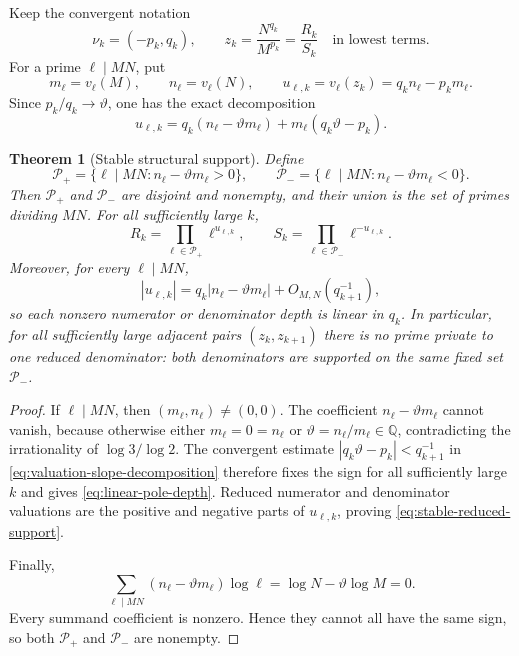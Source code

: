 \documentclass[11pt,oneside]{article}
\newtheorem{theorem}{Theorem}[section]
\theoremstyle{definition}
\theoremstyle{remark}
\newcommand{\Q}{\mathbb Q}
\newcommand{\thetaAE}{\vartheta}
\begin{document}
Keep the convergent notation
\[
 \nu_k=(-p_k,q_k),\qquad
 z_k=\frac{N^{q_k}}{M^{p_k}}=\frac{R_k}{S_k}
 \quad\text{in lowest terms}.
\]
For a prime $\ell\mid MN$, put
\begin{equation}
 m_\ell=v_\ell(M),\qquad n_\ell=v_\ell(N),\qquad
 u_{\ell,k}=v_\ell(z_k)=q_kn_\ell-p_km_\ell.
 \label{eq:structural-valuation}
\end{equation}
Since $p_k/q_k\to\thetaAE$, one has the exact decomposition
\begin{equation}
 u_{\ell,k}
 =q_k(n_\ell-\thetaAE m_\ell)
  +m_\ell(q_k\thetaAE-p_k).
 \label{eq:valuation-slope-decomposition}
\end{equation}

\begin{theorem}[Stable structural support]
\label{thm:support-stabilization}
Define
\begin{equation}
 \mathcal P_+=\{\ell\mid MN:n_\ell-\thetaAE m_\ell>0\},
 \qquad
 \mathcal P_-=\{\ell\mid MN:n_\ell-\thetaAE m_\ell<0\}.
 \label{eq:stable-support-sets}
\end{equation}
Then $\mathcal P_+$ and $\mathcal P_-$ are disjoint and nonempty, and their union is
the set of primes dividing $MN$.  For all sufficiently large $k$,
\begin{equation}
 R_k=\prod_{\ell\in\mathcal P_+}\ell^{u_{\ell,k}},
 \qquad
 S_k=\prod_{\ell\in\mathcal P_-}\ell^{-u_{\ell,k}}.
 \label{eq:stable-reduced-support}
\end{equation}
Moreover, for every $\ell\mid MN$,
\begin{equation}
 |u_{\ell,k}|
 =q_k|n_\ell-\thetaAE m_\ell|+O_{M,N}(q_{k+1}^{-1}),
 \label{eq:linear-pole-depth}
\end{equation}
so each nonzero numerator or denominator depth is linear in $q_k$.
In particular, for all sufficiently large adjacent pairs $(z_k,z_{k+1})$ there is no prime
private to one reduced denominator: both denominators are supported on the same fixed set
$\mathcal P_-$.
\end{theorem}

\begin{proof}
If $\ell\mid MN$, then $(m_\ell,n_\ell)\ne(0,0)$.  The coefficient
$n_\ell-\thetaAE m_\ell$ cannot vanish, because otherwise either $m_\ell=0=n_\ell$ or
$\thetaAE=n_\ell/m_\ell\in\Q$, contradicting the irrationality of $\log3/\log2$.
The convergent estimate $|q_k\thetaAE-p_k|<q_{k+1}^{-1}$ in
\eqref{eq:valuation-slope-decomposition} therefore fixes the sign for all sufficiently large
$k$ and gives \eqref{eq:linear-pole-depth}.  Reduced numerator and denominator valuations are
the positive and negative parts of $u_{\ell,k}$, proving
\eqref{eq:stable-reduced-support}.

Finally,
\[
 \sum_{\ell\mid MN}(n_\ell-\thetaAE m_\ell)\log\ell
 =\log N-\thetaAE\log M=0.
\]
Every summand coefficient is nonzero.  Hence they cannot all have the same sign, so both
$\mathcal P_+$ and $\mathcal P_-$ are nonempty.
\end{proof}
\end{document}
